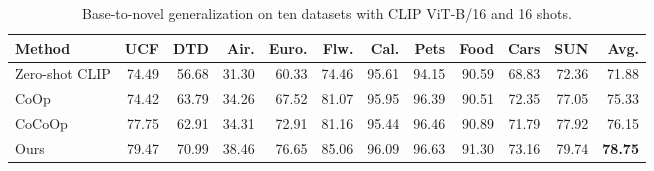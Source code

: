 \begin{table}[t]
\centering
\caption{Base-to-novel generalization on ten datasets with CLIP ViT-B/16 and 16 shots.}
\label{tab:ten-dataset-main}
\small
\setlength{\tabcolsep}{3pt}
\begin{tabular}{lrrrrrrrrrrr}
\toprule
Method & UCF & DTD & Air. & Euro. & Flw. & Cal. & Pets & Food & Cars & SUN & Avg. \\
\midrule
Zero-shot CLIP & 74.49 & 56.68 & 31.30 & 60.33 & 74.46 & 95.61 & 94.15 & 90.59 & 68.83 & 72.36 & 71.88 \\
CoOp & 74.42 & 63.79 & 34.26 & 67.52 & 81.07 & 95.95 & 96.39 & 90.51 & 72.35 & 77.05 & 75.33 \\
CoCoOp & 77.75 & 62.91 & 34.31 & 72.91 & 81.16 & 95.44 & 96.46 & 90.89 & 71.79 & 77.92 & 76.15 \\
Ours & 79.47 & 70.99 & 38.46 & 76.65 & 85.06 & 96.09 & 96.63 & 91.30 & 73.16 & 79.74 & \textbf{78.75} \\
\bottomrule
\end{tabular}
\end{table}
